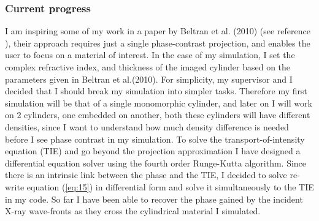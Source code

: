 \documentclass[9pt, a4paper]{article}
\begin{document}
\subsubsection{Current progress}
I am inspiring some of my work in a paper by Beltran et al. (2010) (see reference \cite{Beltran}), their approach requires just a single phase-contrast projection, and enables the user to focus on a material of interest. In the case of my simulation, I set the complex refractive index, and thickness of the imaged cylinder based on the parameters given in Beltran et al.(2010)\cite{CH49}. For simplicity, my supervisor and I decided that I should break my simulation into simpler tasks. Therefore my first simulation will be that of a single monomorphic cylinder, and later on I will work on 2 cylinders, one embedded on another, both these cylinders will have different densities, since I want to understand how much density difference is needed before I see phase contrast in my simulation.
To solve the transport-of-intensity equation (TIE) and go beyond the projection approximation I have designed a differential equation solver using the fourth order Runge-Kutta algorithm. Since there is an intrinsic link between the phase and the TIE, I decided to solve re-write equation (\ref{eq:15}) in differential form and solve it simultaneously to the TIE in my code.
So far I have been able to recover the phase gained by the incident X-ray wave-fronts as they cross the cylindrical material I simulated.
\end{document}
